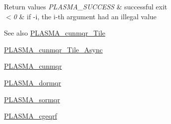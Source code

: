 \begin{DoxyRetVals}{Return values}
{\em P\+L\+A\+S\+M\+A\+\_\+\+S\+U\+C\+C\+E\+S\+S} & successful exit \\
\hline
{\em $<$0} & if -\/i, the i-\/th argument had an illegal value\\
\hline
\end{DoxyRetVals}
\begin{DoxySeeAlso}{See also}
\hyperlink{group__PLASMA__Complex32__t__Tile_ga2ac6814a64f31e0b1659a8f94b621a1d_ga2ac6814a64f31e0b1659a8f94b621a1d}{P\+L\+A\+S\+M\+A\+\_\+cunmqr\+\_\+\+Tile} 

\hyperlink{group__PLASMA__Complex32__t__Tile__Async_gaff053a5b7bc9208a3a61a4117c454355_gaff053a5b7bc9208a3a61a4117c454355}{P\+L\+A\+S\+M\+A\+\_\+cunmqr\+\_\+\+Tile\+\_\+\+Async} 

\hyperlink{group__PLASMA__Complex32__t_gac4f6c16a5e7d9bc92ec6addcaa42bad1_gac4f6c16a5e7d9bc92ec6addcaa42bad1}{P\+L\+A\+S\+M\+A\+\_\+cunmqr} 

\hyperlink{group__double_ga9623493d89eb656c0f5aa44c7772294c_ga9623493d89eb656c0f5aa44c7772294c}{P\+L\+A\+S\+M\+A\+\_\+dormqr} 

\hyperlink{group__float_ga3d2c263d860db4a6d63fd13156262bd2_ga3d2c263d860db4a6d63fd13156262bd2}{P\+L\+A\+S\+M\+A\+\_\+sormqr} 

\hyperlink{group__PLASMA__Complex32__t_gae8490d9c587725716adbb347d85537b2_gae8490d9c587725716adbb347d85537b2}{P\+L\+A\+S\+M\+A\+\_\+cgeqrf} 
\end{DoxySeeAlso}
